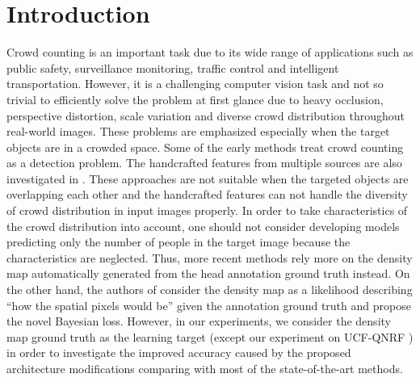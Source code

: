 \documentclass[10pt, conference, a4paper]{IEEEtran}
\begin{document}
\section{Introduction}

Crowd counting is an important task due to its wide range of applications such as public safety, surveillance monitoring, traffic control and intelligent transportation. However, it is a challenging computer vision task and not so trivial to efficiently solve the problem at first glance due to heavy occlusion, perspective distortion, scale variation and diverse crowd distribution throughout real-world images. These problems are emphasized especially when the target objects are in a crowded space. Some of the early methods \cite{dollar2011pedestrian} treat crowd counting as a detection problem. The handcrafted features from multiple sources are also investigated in \cite{idrees2013multi}. These approaches are not suitable when the targeted objects are overlapping each other and the handcrafted features can not handle the diversity of crowd distribution in input images properly. In order to take characteristics of the crowd distribution into account, one should not consider developing models predicting only the number of people in the target image because the characteristics are neglected. Thus, more recent methods rely more on the density map automatically generated from the head annotation ground truth instead. On the other hand, the authors of \cite{ma2019bayesian} consider the density map as a likelihood describing ``how the spatial pixels would be'' given the annotation ground truth and propose the novel Bayesian loss. However, in our experiments, we consider the density map ground truth as the learning target (except our experiment on UCF-QNRF \cite{idrees2018composition}) in order to investigate the improved accuracy caused by the proposed architecture modifications comparing with most of the state-of-the-art methods.
\end{document}
